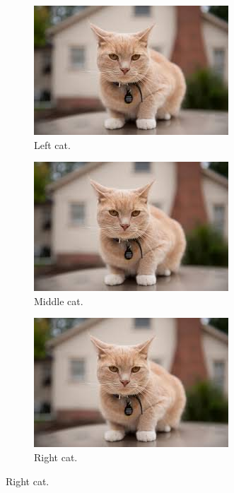 \begin{figure}[ht!]

  \centering
  \begin{subfigure}[b]{0.2\linewidth}
    \includegraphics[width=\linewidth]{images/cat.jpg}
     \caption{Left cat.}
  \end{subfigure}
  \begin{subfigure}[b]{0.2\linewidth}
    \includegraphics[width=\linewidth]{images/cat.jpg}
    \caption{Middle cat.}
  \end{subfigure}
  \begin{subfigure}[b]{0.2\linewidth}
    \includegraphics[width=\linewidth]{images/cat.jpg}
    \caption{Right cat.}
  \end{subfigure}


\end{figure}
